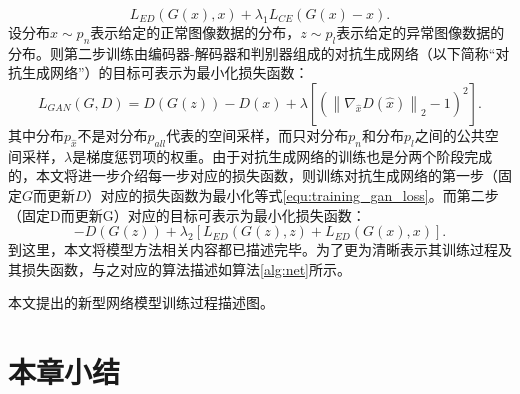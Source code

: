 \begin{equation}
 L_{ED}(G(x), x) + \lambda_{1} L_{CE}(G(x)-x).
\end{equation}
\noindent 设分布$x\sim p_n$表示给定的正常图像数据的分布，$z\sim p_l$表示给定的异常图像数据的分布。则第二步训练由编码器-解码器和判别器组成的对抗生成网络（以下简称“对抗生成网络”）的目标可表示为最小化损失函数：
\begin{equation}\label{equ:training_gan_loss}
L_{GAN}(G, D)=D(G(z))-D(x)+\lambda \left[\left(\left\|\nabla_{\hat{x}} D(\hat{x})\right\|_{2}-1\right)^{2}\right].
\end{equation}
其中分布$p_{\hat{x}}$不是对分布$p_{all}$代表的空间采样，而只对分布$p_n$和分布$p_l$之间的公共空间采样，$\lambda$是梯度惩罚项的权重。由于对抗生成网络的训练也是分两个阶段完成的，本文将进一步介绍每一步对应的损失函数，则训练对抗生成网络的第一步（固定$G$而更新$D$）对应的损失函数为最小化等式\ref{equ:training_gan_loss}。而第二步（固定D而更新G）对应的目标可表示为最小化损失函数：
\begin{equation*}
	-D\left(G(z)\right) + \lambda_{2}\left[L_{ED}(G(z), z) + L_{ED}(G(x), x)\right].
\end{equation*}
\noindent 到这里，本文将模型方法相关内容都已描述完毕。为了更为清晰表示其训练过程及其损失函数，与之对应的算法描述如算法\ref{alg:net}所示。
\begin{algorithm}[h]
	\SetAlgoLined
	\caption{本文提出的新型网络模型训练过程描述图。}
	\label{alg:net}
	\nl {}
\end{algorithm}
\section{本章小结}\label{sec:chapter3_summary}

